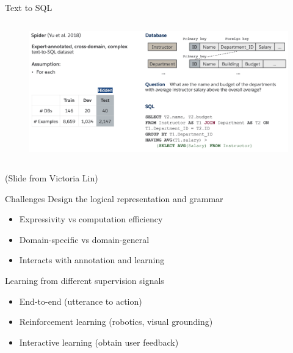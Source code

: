 \documentclass[usenames,dvipsnames,notes,11pt,aspectratio=169]{beamer}
\begin{document}
\begin{frame}
    {Text to SQL}
    \begin{figure}
        \includegraphics[height=6cm]{figures/text2sql}
    \end{figure}
    (Slide from Victoria Lin)
\end{frame}

\begin{frame}
    {Challenges}
        Design the logical representation and grammar
        \begin{itemize}
            \item Expressivity vs computation efficiency
            \item Domain-specific vs domain-general 
            \item Interacts with annotation and learning
        \end{itemize}

        Learning from different supervision signals
        \begin{itemize}
            \item End-to-end (utterance to action)
            \item Reinforcement learning (robotics, visual grounding)
            \item Interactive learning (obtain user feedback)
        \end{itemize}
\end{frame}
\end{document}
